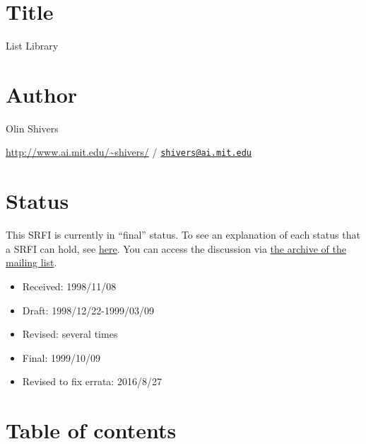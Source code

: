 \section{Title}\label{title}

List Library

\section{Author}\label{author}

Olin Shivers

\url{http://www.ai.mit.edu/~shivers/} /
\href{mailto:shivers@ai.mit.edu}{\nolinkurl{shivers@ai.mit.edu}}

\section{Status}\label{status}

This SRFI is currently in ``final'' status. To see an explanation of
each status that a SRFI can hold, see
\href{http://srfi.schemers.org/srfi-process.html}{here}. You can access
the discussion via \href{mail-archive/maillist.html}{the archive of the
mailing list}.

\begin{itemize}
\tightlist
\item
  Received: 1998/11/08
\item
  Draft: 1998/12/22-1999/03/09
\item
  Revised: several times
\item
  Final: 1999/10/09
\item
  Revised to fix errata: 2016/8/27
\end{itemize}

\section{Table of contents}\label{table-of-contents}

